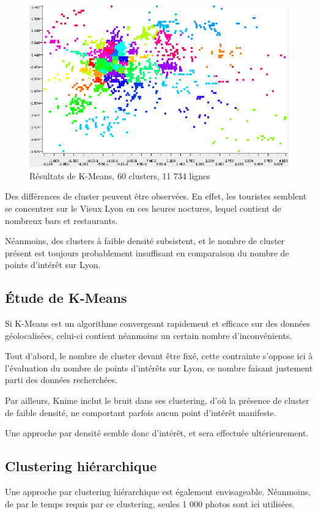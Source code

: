 \begin{figure}[H]
    \centering
    \includegraphics[width=\linewidth]{img/60_means_night.png}
    \caption{Résultats de K-Means, 60 clusters, 11 734 lignes}
\end{figure}

Des différences de cluster peuvent être observées. En effet, les touristes semblent se concentrer sur le Vieux Lyon en ces heures noctures, lequel contient de nombreux bars et restaurants.

Néanmoins, des clusters à faible densité subsistent, et le nombre de cluster présent est toujours probablement insuffisant en comparaison du nombre de points d'intérêt sur Lyon.


\subsection{Étude de K-Means}
Si K-Means est un algorithme convergeant rapidement et efficace sur des données géolocalisées, celui-ci contient néanmoins un certain nombre d'inconvénients.

Tout d'abord, le nombre de cluster devant être fixé, cette contrainte s'oppose ici à l'évaluation du nombre de points d'intérêts sur Lyon, ce nombre faisant justement parti des données recherchées.

Par ailleurs, Knime inclut le bruit dans ses clustering, d'où la présence de cluster de faible densité, ne comportant parfois aucun point d'intérêt manifeste.

Une approche par densité semble donc d'intérêt, et sera effectuée ultérieurement.
\pagebreak



\subsection{Clustering hiérarchique}
Une approche par clustering hiérarchique est également envisageable. Néanmoins, de par le temps requis par ce clustering, seules 1 000 photos sont ici utilisées.

